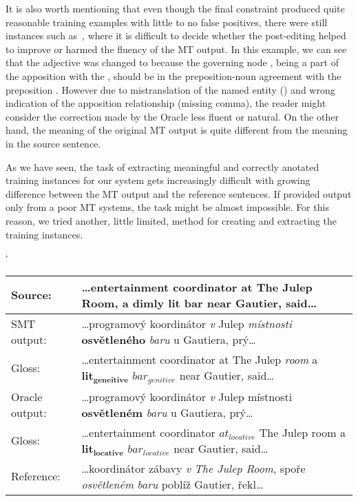 It is also worth mentioning that even though the final constraint produced quite reasonable training examples
with little to no false positives, %
there were still instances such as~, where it is difficult to decide whether the post-editing
helped to improve or harmed the fluency of the MT output.
In this example, we can see that the adjective  was changed to  because the
governing node , being a part of the apposition with the , should
be in the preposition-noun agreement with the preposition . However due to mistranslation of the
named entity () and wrong indication of the apposition relationship (missing comma),
the reader might consider the correction made by the Oracle less fluent or natural. On the other hand,
the meaning of the original MT output is quite different from the meaning in the source sentence.

As we have seen, the task of extracting meaningful and correctly anotated training instances for our system
 gets increasingly difficult with growing difference between the MT output and the reference sentences.
If provided output only from a poor MT systems, the task might be almost impossible. For this reason,
we tried another, little limited, method for creating and extracting the training instances.

\begin{myexample}
    \small
    \catcode`
    \begin{center}
    \begin{tabular}{|l|p{}|}
    \hline
    \textbf{Source:}  &  \textbf{…entertainment coordinator at The Julep Room, a dimly lit bar near Gautier, said…}  \\
    \hline
    SMT output:  &  …programový koordinátor \textit{v} Julep \textit{místnosti} \textbf{osvětleného} \textit{baru} u Gautiera, prý…  \\
    \hline
    Gloss:  &  …entertainment coordinator at The Julep \textit{room} a $\mathbf{lit_{geneitive}}$ $\mathit{bar_{genitive}}$ near Gautier, said…  \\
    \hline
    Oracle output:  &  …programový koordinátor \textit{v} Julep místnosti \textbf{osvětleném} \textit{baru} u Gautiera, prý…  \\
    \hline
    Gloss:  &  …entertainment coordinator $\mathit{at_{locative}}$ The Julep room a $\mathbf{lit_{locative}}$ $\mathit{bar_{locative}}$ near Gautier, said…  \\
    \hline
    Reference:  &  …koordinátor zábavy \textit{v} \textit{The Julep Room}, spoře \textit{osvětleném} \textit{baru} poblíž Gautier, řekl…  \\
    \hline
    \end{tabular}
    \label{ex-oracle-noref}
    \end{center}
\end{myexample}

